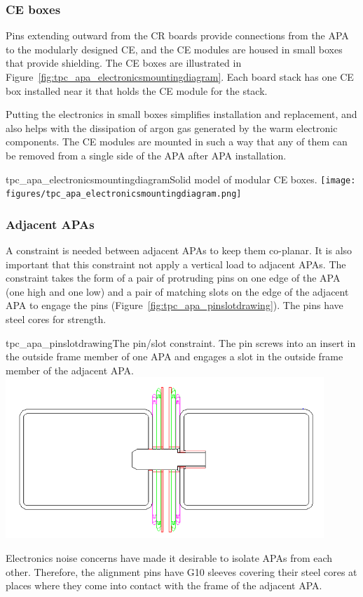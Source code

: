 \subsubsection{CE boxes}

Pins extending outward from the CR boards provide connections from the APA to the modularly designed CE, and the CE modules are housed in small boxes that provide shielding.
The CE boxes are illustrated in Figure~\ref{fig:tpc_apa_electronicsmountingdiagram}. 
Each board stack has one CE box installed near it that holds the CE module for the stack.  

Putting the electronics in small boxes simplifies installation and replacement, and also helps with the dissipation 
of argon gas generated by the warm electronic components.  The CE modules are mounted in such a way that any of them can be removed from a single side of the APA after APA installation.

\begin{cdrfigure}{tpc_apa_electronicsmountingdiagram}{Solid model of %
modular CE boxes.}
\texttt{[image: figures/tpc\_apa\_electronicsmountingdiagram.png]} 
\end{cdrfigure}

\subsubsection{Adjacent APAs}

A constraint is needed between adjacent APAs to keep them co-planar.  It is also important that this constraint not apply a vertical load to adjacent APAs.  The constraint takes the form of 
 a pair of protruding pins on one edge of the APA (one high and one low) and a pair of matching slots %
on the edge of the adjacent APA
to engage the pins (Figure~\ref{fig:tpc_apa_pinslotdrawing}). The pins have steel cores for strength.

\begin{cdrfigure}{tpc_apa_pinslotdrawing}{The pin/slot constraint.  The pin screws into an insert in the outside frame member of one APA and engages a slot in the outside frame member of the adjacent APA.}
\includegraphics[width=0.9\textwidth]{figures/tpc_apa_pinslotdrawing.png} 
\end{cdrfigure}

Electronics noise concerns have made it desirable to isolate APAs from each other.  Therefore, the alignment pins have G10 sleeves covering their steel cores at places where they come into contact with the frame of the adjacent APA.



